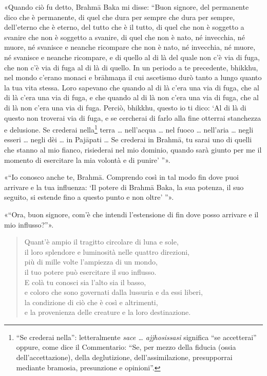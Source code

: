 «Quando ciò fu detto, Brahmā Baka mi disse: “Buon signore, del
permanente dico che è permanente, di quel che dura per sempre che dura
per sempre, dell’eterno che è eterno, del tutto che è il tutto, di quel
che non è soggetto a svanire che non è soggetto a svanire, di quel che
non è nato, né invecchia, né muore, né svanisce e neanche ricompare che
non è nato, né invecchia, né muore, né svanisce e neanche ricompare, e
di quello al di là del quale non c’è via di fuga, che non c’è via di
fuga al di là di quello. In un periodo a te precedente, bhikkhu, nel
mondo c’erano monaci e brāhmaṇa il cui ascetismo durò tanto a lungo
quanto la tua vita stessa. Loro sapevano che quando al di là c’era una
via di fuga, che al di là c’era una via di fuga, e che quando al di là
non c’era una via di fuga, che al di là non c’era una via di fuga.
Perciò, bhikkhu, questo io ti dico: ‘Al di là di questo non troverai via
di fuga, e se cercherai di farlo alla fine otterrai stanchezza e
delusione. Se crederai nella\footnote{“Se crederai nella”: letteralmente \emph{sace … ajjhosissasi} significa “se accetterai” oppure, come dice il Commentario: “Se, per mezzo della fiducia (ossia dell’accettazione), della deglutizione, dell’assimilazione, presupporrai mediante bramosia, presunzione e opinioni”.} terra … nell’acqua … nel
fuoco … nell’aria … negli esseri … negli dèi … in Pajāpati … Se crederai
in Brahmā, tu sarai uno di quelli che stanno al mio fianco, risiederai
nel mio dominio, quando sarà giunto per me il momento di esercitare la
mia volontà e di punire’ ”».


«“Io conosco anche te, Brahmā. Comprendo così in tal modo fin dove puoi
arrivare e la tua influenza: ‘Il potere di Brahmā Baka, la sua potenza,
il suo seguito, si estende fino a questo punto e non oltre’ ”».


«“Ora, buon signore, com’è che intendi l’estensione di fin dove posso
arrivare e il mio influsso?”».


\begin{quote}
Quant’è ampio il tragitto circolare di luna e sole, \\
il loro splendore e luminosità nelle quattro direzioni, \\
più di mille volte l’ampiezza di un mondo, \\
il tuo potere può esercitare il suo influsso. \\
E colà tu conosci sia l’alto sia il basso, \\
e coloro che sono governati dalla lussuria e da essi liberi, \\
la condizione di ciò che è così e altrimenti, \\
e la provenienza delle creature e la loro destinazione.
\end{quote}

